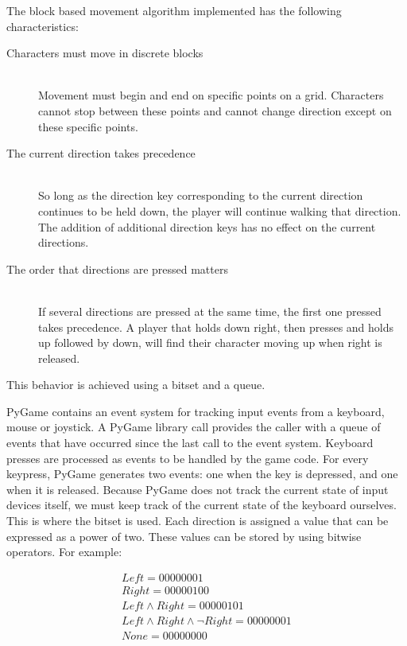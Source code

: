 \documentclass[11pt]{article}
\begin{document}
The block based movement algorithm implemented has the following characteristics:
\begin{description}
   \item[Characters must move in discrete blocks] \hfill \\
   Movement must begin and end on specific points on a grid.  Characters cannot stop between these points and cannot change direction except on these specific points. 
   \item[The current direction takes precedence] \hfill \\
   So long as the direction key corresponding to the current direction continues to be held down, the player will continue walking that direction.  The addition of additional direction keys has no effect on the current directions.
   \item[The order that directions are pressed matters] \hfill \\
   If several directions are pressed at the same time, the first one pressed takes precedence.  A player that holds down right, then presses and holds up followed by down, will find their character moving up when right is released.
\end{description}

This behavior is achieved using a bitset and a queue.  

PyGame contains an event system for tracking input events from a keyboard, mouse or joystick.  A PyGame library call provides the caller with a queue of events that have occurred since the last call to the event system.  Keyboard presses are processed as events to be handled by the game code.  For every keypress, PyGame generates two events: one when the key is depressed, and one when it is released.  Because PyGame does not track the current state of input devices itself, we must keep track of the current state of the keyboard ourselves.  This is where the bitset is used.  Each direction is assigned a value that can be expressed as a power of two. These values can be stored by using bitwise operators.  For example:

\begin{align*}
Left = 00000001 \\ 
Right = 00000100 \\
Left \land Right = 00000101 \\
Left \land Right \land \neg Right = 00000001 \\
None = 00000000
\end{align*}
\end{document}
